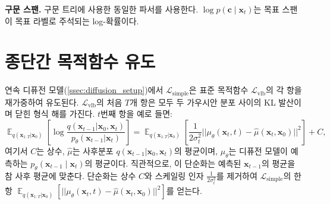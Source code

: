 \documentclass{article}
\newcommand{\expmb}[1]{\mathbf{#1}}
\newcommand{\expobj}[1]{\mathcal{L}_\text{#1}}
\newcommand{\cc}{\expmb{c}}
\newcommand{\cx}[1]{\mathbf{x}_{#1}}
\newcommand{\ptheta}{p_\theta}
\newcommand{\Lsimple}{\expobj{simple}}
\newcommand{\Lvlb}{\expobj{vlb}}
\begin{document}
\textbf{구문 스팬.} 구문 트리에 사용한 동일한 파서를 사용한다. $\log p(\cc \mid \cx{t})$는 목표 스팬이 목표 라벨로 주석되는 log-확률이다.

\section{종단간 목적함수 유도}
\label{app:derive}
연속 디퓨전 모델(\cref{ssec:diffusion_setup})에서 $\Lsimple$은 표준 목적함수 $\Lvlb$의 각 항을 재가중하여 유도된다.
$\Lvlb$의 처음 $T$개 항은 모두 두 가우시안 분포 사이의 KL 발산이며 닫힌 형식 해를 가진다. $t$번째 항을 예로 들면:
\begin{equation}
\mathop{\mathbb{E}}_{q(\cx{1:T} | \cx{0})} \left[ \log \frac{q(\cx{t-1} | \cx{0},\cx{t})} {\ptheta(\cx{t-1} | \cx{t}) }\right] = \mathop{\mathbb{E}}_{ q(\cx{1:T} | \cx{0})}  \left[ \frac{1}{2\sigma_t^2}  || \mu_\theta(\cx{t}, t) - \hat{\mu}(\cx{t}, \cx{0}) ||^2\right] + C, 
\label{app:eqn:simple}
\end{equation}
여기서 $C$는 상수, $\hat{\mu}$는 사후분포 $q(\cx{t-1} | \cx{0},\cx{t})$의 평균이며, $\mu_\theta$는 디퓨전 모델이 예측하는 $\ptheta(\cx{t-1} \mid \cx{t})$의 평균이다. 직관적으로, 이 단순화는 예측된 $\cx{t-1}$의 평균을 참 사후 평균에 맞춘다. 단순화는 상수 $C$와 스케일링 인자 $\frac{1}{2\sigma_t^2}$를 제거하여 $\Lsimple$의 한 항 $\mathop{\mathbb{E}}_{ q(\cx{1:T} | \cx{0})} \left[ || \mu_\theta(\cx{t}, t) - \hat{\mu}(\cx{t}, \cx{0}) ||^2\right]$를 얻는다.
\end{document}
